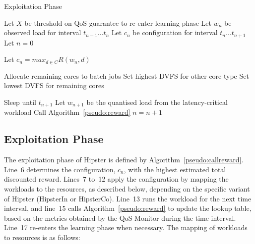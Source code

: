 \begin{algorithm}[tb]
  \caption{Exploitation Phase}
  \label{pseudo:callreward}
  \begin{algorithmic}[1]
    \State Let $X$ be threshold on QoS guarantee to re-enter learning phase
    \State Let $w_n$ be observed load for interval $t_{n-1}\dots t_n$
    \State Let $c_n$ be configuration for interval $t_n \dots t_{n+1}$
    \State Let $n = 0$
    \Repeat 

    \Statex {}
    \State Let $c_n = max_{d\in C}R(w_n,d)$	

		\State Allocate remaining cores to batch jobs
        \State Set highest DVFS for other core type
        \EndIf
     \Else
     	\State Set lowest DVFS for remaining cores     
     \EndIf

     	\State Sleep until $t_{n+1}$  
        \State Let $w_{n+1}$ be the quantised load from the latency-critical workload
        \State Call Algorithm~\ref{pseudo:reward} 
    \State $n = n+1$
    
  \end{algorithmic}
\end{algorithm}


\subsection{Exploitation Phase}
\label{subsec: exploitation}

The exploitation phase of Hipster is defined by Algorithm~\ref{pseudo:callreward}. Line~6
determines the configuration, $c_n$, with the highest estimated total discounted reward.
Lines~7 to~12 apply the configuration by mapping the workloads to the resources, as
described below, depending on the specific variant of Hipster (HipsterIn or HipsterCo).
Line~13 runs the workload for the next time interval, and line~15 calls
Algorithm~\ref{pseudo:reward} to update the lookup table, based on the metrics obtained by
the QoS Monitor during the time interval. Line~17 re-enters the learning phase when
necessary.  The mapping of workloads to resources is as follows:

